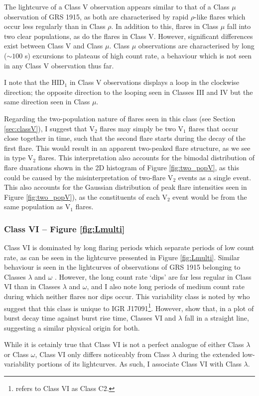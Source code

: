 \par The lightcurve of a Class V observation appears similar to that of a Class $\mu$ observation of GRS 1915, as both are characterised by rapid $\rho$-like flares which occur less regularly than in Class $\rho$.  In addition to this, flares in Class $\mu$ fall into two clear populations, as do the flares in Class V.  However, significant differences exist between Class V and Class $\mu$.  Class $\mu$ observations are characterised by long ($\sim100$ s) excursions to plateaus of high count rate, a behaviour which is not seen in any Class V observation thus far.
\par I note that the HID$_1$ in Class V observations displays a loop in the clockwise direction; the opposite direction to the looping seen in Classes III and IV but the same direction seen in Class $\mu$.
\par Regarding the two-population nature of flares seen in this class (see Section \ref{sec:classV}), I suggest that V$_2$ flares may simply be two V$_1$ flares that occur close together in time, such that the second flare starts during the decay of the first flare.  This would result in an apparent two-peaked flare structure, as we see in type V$_2$ flares.  This interpretation also accounts for the bimodal distribution of flare duarations shown in the 2D histogram of Figure \ref{fig:two_popV}, as this could be caused by the misinterpretation of two-flare V$_2$ events as a single event.  This also accounts for the Gaussian distribution of peak flare intensities seen in Figure \ref{fig:two_popV}), as the constituents of each V$_2$ event would be from the same population as V$_1$ flares.

\subsubsection{Class VI -- Figure \ref{fig:Lmulti}}

\par Class VI is dominated by long flaring periods which separate periods of low count rate, as can be seen in the lightcurve presented in Figure \ref{fig:Lmulti}.  Similar behaviour is seen in the lightcurves of observations of GRS 1915 belonging to Classes $\lambda$ and $\omega$ \citep{KleinWolt_OmegaClass}.  However, the long count rate `dips' are far less regular in Class VI than in Classes $\lambda$ and $\omega$, and I also note long periods of medium count rate during which neither flares nor dips occur.  This variability class is noted by \citet{Pahari_IGRClasses} who suggest that this class is unique to IGR J17091\footnote{\citet{Pahari_IGRClasses} refers to Class VI as Class C2.}.  However, \citet{Pahari_ClassVI} show that, in a plot of burst decay time against burst rise time, Classes VI and $\lambda$ fall in a straight line, suggesting a similar physical origin for both.
\par While it is cetainly true that Class VI is not a perfect analogue of either Class $\lambda$ or Class $\omega$, Class VI only differs noticeably from Class $\lambda$ during the extended low-variability portions of its lightcurves.  As such, I associate Class VI with Class $\lambda$.

